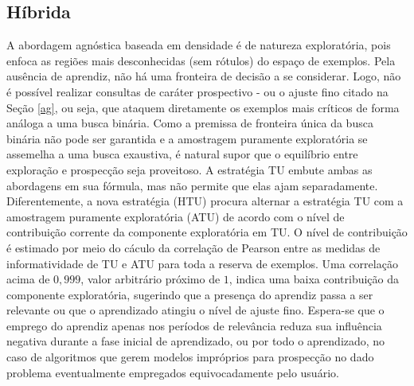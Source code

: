 \subsection{Híbrida}\label{htu}
A abordagem agnóstica baseada em densidade é de natureza exploratória,
pois enfoca as regiões mais desconhecidas (sem rótulos) do espaço de exemplos.
Pela ausência de aprendiz, não há uma fronteira de decisão a se considerar.
Logo, não é possível realizar consultas de caráter prospectivo - ou o ajuste fino citado
na Seção \ref{ag}, ou seja,
que ataquem diretamente os exemplos mais críticos de forma análoga a uma busca binária.
Como a premissa de fronteira única da busca binária não pode ser garantida e
a amostragem puramente exploratória se assemelha a uma busca exaustiva,
é natural supor que o equilíbrio entre exploração e prospecção seja proveitoso.
A estratégia TU embute ambas as abordagens em sua fórmula, mas não
permite que elas ajam separadamente.
Diferentemente,
a nova estratégia (HTU) procura alternar a estratégia TU com a amostragem
puramente exploratória (ATU) de acordo com o nível de contribuição corrente
da componente exploratória em TU.
O nível de contribuição é estimado por meio do cáculo da correlação de
Pearson \citep{books/daglib/0000786} entre as medidas de informatividade de
TU e ATU para toda a reserva de exemplos.
Uma correlação acima de $0,999$, valor arbitrário próximo de $1$,
indica uma baixa contribuição da componente exploratória,
sugerindo que a presença do aprendiz passa a ser relevante ou
que o aprendizado atingiu o nível de ajuste fino.
Espera-se que o emprego do aprendiz apenas nos períodos de relevância
reduza sua influência negativa durante a fase inicial de aprendizado,
ou por todo o aprendizado, no caso de algoritmos que gerem modelos impróprios
para prospecção no dado problema eventualmente empregados equivocadamente
pelo usuário.


 
